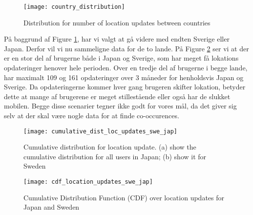 

\begin{figure}[H]
    \centering
    \texttt{[image: country\_distribution]}
    \caption{Distribution for number of location updates between countries}
    \label{fig:country_dist}
\end{figure}

På baggrund af Figure \ref{fig:country_dist}, har vi valgt at gå videre med endten Sverige eller Japan. Derfor vil vi nu sammeligne data for de to lande. 
På Figure \ref{fig:country_cd} ser vi at der er en stor del af brugerne både i Japan og Sverige, som har meget få lokations opdateringer henover hele perioden. Over en tredje del af brugerne i begge lande, har maximalt 109 og 161 opdateringer over 3 måneder for henholdsvis Japan og Sverige. Da opdateringerne kommer hver gang brugeren skifter lokation, betyder dette at mange af brugerene er meget stillestående eller også har de slukket mobilen. Begge disse scenarier tegner ikke godt for vores mål, da det giver sig selv at der skal være nogle data for at finde co-occurences. 


\begin{figure}[H]
    \centering
    \texttt{[image: cumulative\_dist\_loc\_updates\_swe\_jap]}
    \caption[Cumulative distribution for location update]{Cumulative distribution for location update. (a) show the cumulative distribution for all users in Japan; (b) show it for Sweden}
    \label{fig:country_cd}
\end{figure}



\begin{figure}[H]
    \centering
    \texttt{[image: cdf\_location\_updates\_swe\_jap]}
    \caption{Cumulative Distribution Function (CDF) over location updates for Japan and Sweden}
    \label{fig:country_cdf}
\end{figure}

